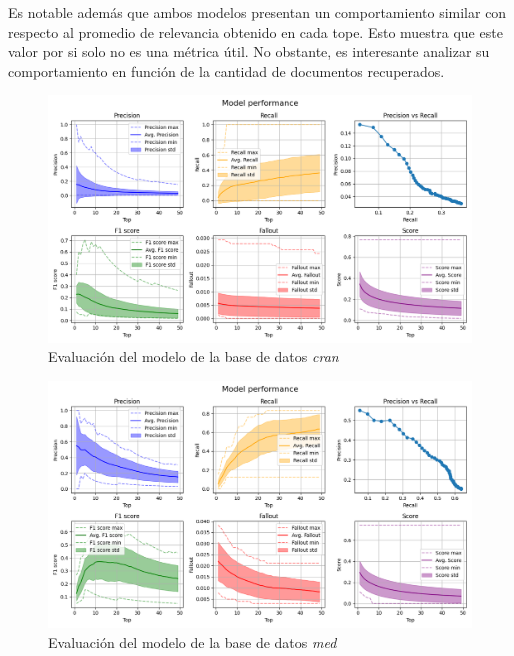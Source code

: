 Es notable además que ambos modelos presentan un comportamiento similar con
respecto al promedio de relevancia obtenido en cada tope. Esto muestra que
este valor por si solo no es una métrica útil. No obstante, es interesante
analizar su comportamiento en función de la cantidad de documentos recuperados.

\begin{figure}[htb]%
	\begin{center}
		\includegraphics[width=1.0\textwidth]{./cran_eval.png}
	\end{center}
	\caption{Evaluación del modelo de la base de datos \emph{cran}}
	\label{fig:cran-eval}
\end{figure}


\begin{figure}[htb]%
	\begin{center}
		\includegraphics[width=1.0\textwidth]{./med_eval.png}
	\end{center}
	\caption{Evaluación del modelo de la base de datos \emph{med}}
	\label{fig:med-eval}
\end{figure}

